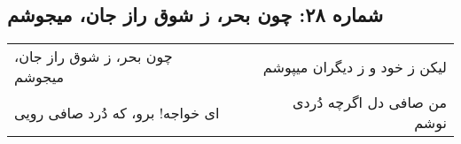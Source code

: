 \begin{center}
\section*{شماره ۲۸: چون بحر، ز شوق راز جان، میجوشم}
\label{sec:028}
\begin{longtable}{l p{0.5cm} r}
چون بحر، ز شوق راز جان، میجوشم
&&
لیکن ز خود و ز دیگران میپوشم
\\
ای خواجه! برو، که دُرد صافی رویی
&&
من صافی دل اگرچه دُردی نوشم
\\
\end{longtable}
\end{center}
